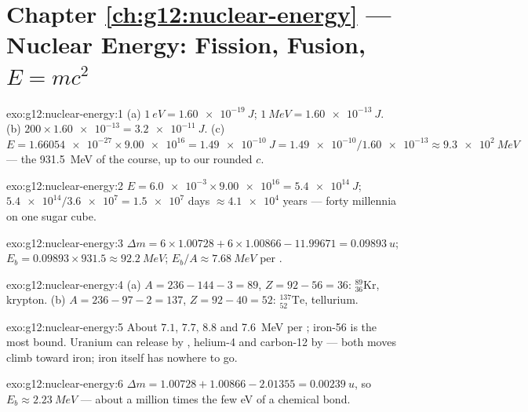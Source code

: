 \section*{Chapter \ref{ch:g12:nuclear-energy} --- Nuclear Energy: Fission, Fusion, $E=mc^2$}

\begin{solution}{exo:g12:nuclear-energy:1}
(a) $\qty{1}{eV} = \qty{1.60e-19}{J}$;
$\qty{1}{MeV} = \qty{1.60e-13}{J}$.
(b) $200 \times \num{1.60e-13} = \qty{3.2e-11}{J}$.
(c) $E = \num{1.66054e-27} \times \num{9.00e16} = \qty{1.49e-10}{J}
= \num{1.49e-10}/\num{1.60e-13} \approx \qty{9.3e2}{MeV}$ --- the
\qty{931.5}{MeV} of the course, up to our rounded $c$.
\end{solution}

\begin{solution}{exo:g12:nuclear-energy:2}
$E = \num{6.0e-3} \times \num{9.00e16} = \qty{5.4e14}{J}$;
$\num{5.4e14}/\num{3.6e7} = \num{1.5e7}$ days $\approx \num{4.1e4}$
years --- forty millennia on one sugar cube.
\end{solution}

\begin{solution}{exo:g12:nuclear-energy:3}
$\Delta m = 6 \times 1.00728 + 6 \times 1.00866 - 11.99671 =
\qty{0.09893}{u}$; $E_b = 0.09893 \times 931.5 \approx \qty{92.2}{MeV}$;
$E_b/A \approx \qty{7.68}{MeV}$ per .
\end{solution}

\begin{solution}{exo:g12:nuclear-energy:4}
(a) $A = 236 - 144 - 3 = 89$, $Z = 92 - 56 = 36$:
${}^{89}_{36}\mathrm{Kr}$, krypton.
(b) $A = 236 - 97 - 2 = 137$, $Z = 92 - 40 = 52$:
${}^{137}_{52}\mathrm{Te}$, tellurium.
\end{solution}

\begin{solution}{exo:g12:nuclear-energy:5}
About $7.1$, $7.7$, $8.8$ and \qty{7.6}{MeV} per ; iron-56 is
the most bound. Uranium can release  by , helium-4 and
carbon-12 by  --- both moves climb toward iron; iron itself has
nowhere to go.
\end{solution}

\begin{solution}{exo:g12:nuclear-energy:6}
$\Delta m = 1.00728 + 1.00866 - 2.01355 = \qty{0.00239}{u}$, so
$E_b \approx \qty{2.23}{MeV}$ --- about a million times the few
\unit{eV} of a chemical bond.
\end{solution}

